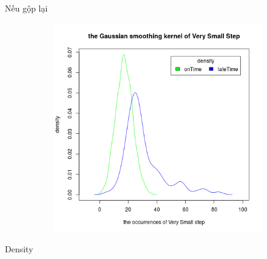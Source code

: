 \documentclass[a4paper, 13pt]{report}
\begin{document}
\FloatBarrier
Nếu gộp lại \\
\FloatBarrier
\begin{figure}[h]
    \begin{subfigure}[b]{0.7\textwidth}
        \includegraphics[width=\textwidth]{DensityVerySmallStep.png}
    \end{subfigure}
\end{figure}
\FloatBarrier
Density 
\FloatBarrier
\end{document}
